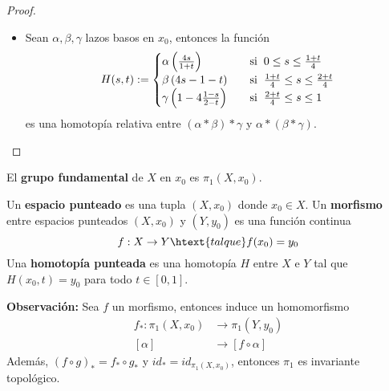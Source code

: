 \documentclass{article}
\begin{document}
\begin{proof}
\begin{itemize}
        \item Sean $\alpha,\beta,\gamma$ lazos basos en $x_{0}$, entonces la función
        \begin{equation*}
            H(s,t):=\begin{cases}
                \alpha\left(\frac{4s}{1+t}\right) 
                &\quad\text{si}\hspace{2mm}0\leq s\leq\frac{1+t}{4} \\
                \beta\left(4s-1-t\right) 
                &\quad\text{si}\hspace{2mm}\frac{1+t}{4}\leq s\leq\frac{2+t}{4} \\
                \gamma\left(1-4\frac{1-s}{2-t}\right) 
                &\quad\text{si}\hspace{2mm}\frac{2+t}{4}\leq s\leq1
            \end{cases}
        \end{equation*}
        es una homotopía relativa entre $(\alpha*\beta)*\gamma$ y $\alpha*(\beta*\gamma)$.
    \end{itemize}
\end{proof}

\begin{dfn}
    El \textbf{grupo fundamental} de $X$ en $x_{0}$ es $\pi_{1}(X,x_{0})$.
\end{dfn}

\vspace{2mm}
\begin{dfn}
    Un \textbf{espacio punteado} es una tupla $(X,x_{0})$ donde $x_{0}\in X$. Un \textbf{morfismo} 
    entre espacios punteados $(X,x_{0})$ y $(Y,y_{0})$ es una función continua
    \begin{equation*}
        f:X\to Y\htext{tal que}f(x_{0})=y_{0}
    \end{equation*}
    Una \textbf{homotopía punteada} es una homotopía $H$ entre $X$ e $Y$ tal que 
    $H(x_{0},t)=y_{0}$ para todo $t\in[0,1]$.
\end{dfn}

\vspace{2mm}
\noindent\textbf{Observación:} Sea $f$ un morfismo, entonces induce un homomorfismo
\begin{align*}
    f_{*}:\pi_{1}(X,x_{0}) &\to \pi_{1}(Y,y_{0}) \\
    [\alpha] &\to [f\circ\alpha]
\end{align*}
Además, $(f\circ g)_{*}=f_{*}\circ g_{*}$ y $id_{*}=id_{\pi_{1}(X,x_{0})}$, entonces $\pi_{1}$ es
invariante topológico.
\end{document}
